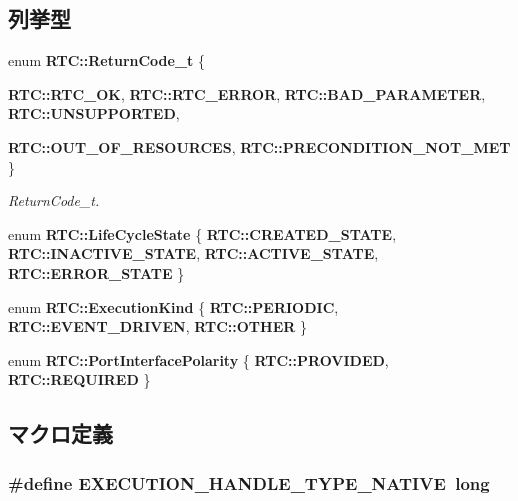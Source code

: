 \subsection*{列挙型}
\begin{DoxyCompactItemize}
\item 
enum {\bf RTC::ReturnCode\_\-t} \{ \par
{\bf RTC::RTC\_\-OK}, 
{\bf RTC::RTC\_\-ERROR}, 
{\bf RTC::BAD\_\-PARAMETER}, 
{\bf RTC::UNSUPPORTED}, 
\par
{\bf RTC::OUT\_\-OF\_\-RESOURCES}, 
{\bf RTC::PRECONDITION\_\-NOT\_\-MET}
 \}
\begin{DoxyCompactList}\small\item\em ReturnCode\_\-t. \item\end{DoxyCompactList}\item 
enum {\bf RTC::LifeCycleState} \{ {\bf RTC::CREATED\_\-STATE}, 
{\bf RTC::INACTIVE\_\-STATE}, 
{\bf RTC::ACTIVE\_\-STATE}, 
{\bf RTC::ERROR\_\-STATE}
 \}
\item 
enum {\bf RTC::ExecutionKind} \{ {\bf RTC::PERIODIC}, 
{\bf RTC::EVENT\_\-DRIVEN}, 
{\bf RTC::OTHER}
 \}
\item 
enum {\bf RTC::PortInterfacePolarity} \{ {\bf RTC::PROVIDED}, 
{\bf RTC::REQUIRED}
 \}
\end{DoxyCompactItemize}


\subsection{マクロ定義}
\subsubsection[{EXECUTION\_\-HANDLE\_\-TYPE\_\-NATIVE}]{\setlength{\rightskip}{0pt plus 5cm}\#define EXECUTION\_\-HANDLE\_\-TYPE\_\-NATIVE~long}\label{RTC_8idl_aeffb3a05d02a2be4851f4c1c59f000c3}
